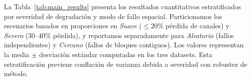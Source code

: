 La Tabla~\ref{tab:main_results} presenta los resultados cuantitativos estratificados por severidad de degradación y modo de fallo espacial. Particionamos los escenarios basados en proporciones en \emph{Suave} ($\leq 20\%$ pérdida de canales) y \emph{Severo} ($30$--$40\%$ pérdida), y reportamos separadamente para \emph{Aleatorio} (fallos independientes) y \emph{Cercano} (fallos de bloques contiguos). Los valores representan la media $\pm$ desviación estándar computadas en los tres datasets. Esta estratificación previene conflación de varianza debida a severidad con robustez de método.

\begin{table}[ht]
\centering
\caption{Media $\pm$ SD de MAE ($\times 10^{-6}$) y SNR (dB) estratificada por severidad de degradación y modo de fallo espacial. Mejores valores por estrato en \textbf{negrilla}.}
\label{tab:main_results}
\end{table}

